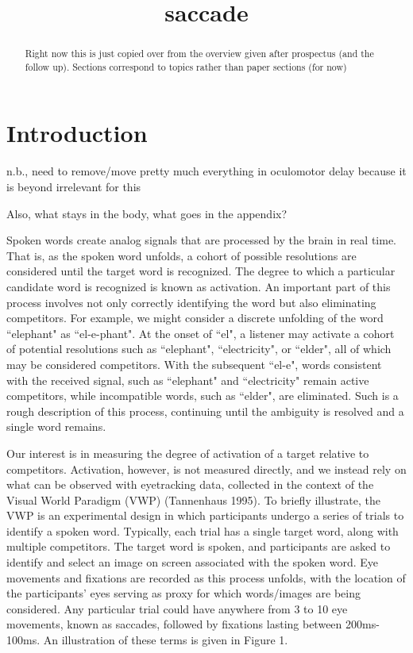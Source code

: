 \documentclass{article}
\title{saccade}
\date{}
\begin{document}

\maketitle

%

\begin{abstract}
Right now this is just copied over from the overview given after prospectus (and the follow up). Sections correspond to topics rather than paper sections (for now)
\end{abstract}

\section{Introduction}

n.b., need to remove/move pretty much everything in oculomotor delay because it is beyond irrelevant for this

Also, what stays in the body, what goes in the appendix?

Spoken words create analog signals that are processed by the brain in real time. That is, as the spoken word unfolds, a cohort of possible resolutions are considered until the target word is recognized. The degree to which a particular candidate word is recognized is known as activation. An important part of this process involves not only correctly identifying the word but also eliminating competitors. For example, we might consider a discrete unfolding of the word ``elephant" as ``el-e-phant". At the onset of ``el", a listener may activate a cohort of potential resolutions such as ``elephant", ``electricity", or ``elder", all of which may be considered competitors. With the subsequent ``el-e", words consistent with the received signal, such as ``elephant" and ``electricity" remain active competitors, while incompatible words, such as ``elder", are eliminated. Such is a rough description of this process, continuing until the ambiguity is resolved and a single word remains.

Our interest is in measuring the degree of activation of a target relative to competitors. Activation, however, is not measured directly, and we instead rely on what can be observed with eyetracking data, collected in the context of the Visual World Paradigm (VWP) (Tannenhaus 1995)\cite{tanenhaus1995integration}. To briefly illustrate, the VWP is an experimental design in which participants undergo a series of trials to identify a spoken word. Typically, each trial has a single target word, along with multiple competitors. The target word is spoken, and participants are asked to identify and select an image on screen associated with the spoken word. Eye movements and fixations are recorded as this process unfolds, with the location of the participants' eyes serving as proxy for which words/images are being considered. Any particular trial could have anywhere from 3 to 10 eye movements, known as saccades, followed by fixations lasting between 200ms-100ms. An illustration of these terms is given in Figure 1. 
\end{document}
